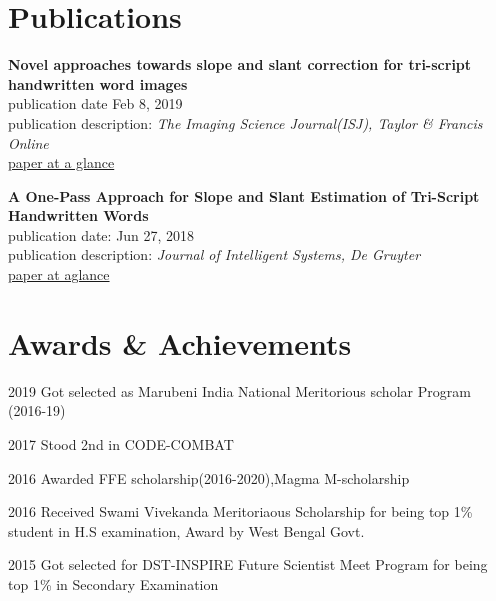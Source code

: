 \documentclass[]{deedy-resume-openfont}
\begin{document}
\begin{minipage}[t]{0.65\textwidth}

\section{Publications} 
\vspace{\topsep} %
\begin{tightemize}
\item 
\textbf{Novel approaches towards slope and slant correction for tri-script handwritten word images}\\
publication date Feb 8, 2019 \\
publication description:
\textit{The Imaging Science Journal(ISJ), Taylor \& Francis Online}\\ 
\href{https://www.tandfonline.com/doi/abs/10.1080/13682199.2019.1574368?journalCode=yims20}{paper at a glance}\\

\item 
\textbf{A One-Pass Approach for Slope and Slant Estimation of Tri-Script Handwritten Words}\\
publication date: Jun 27, 2018 \\
publication description:
\textit{Journal of Intelligent Systems, De Gruyter}\\ 
\href{https://www.degruyter.com/view/j/jisys.ahead-of-print/jisys-2018-0105/jisys-2018-0105.xml}{paper at aglance}\\

\end{tightemize}
\sectionsep



\section{Awards \& Achievements} 
\vspace{\topsep} %
\begin{tightemize}
\item 2019	     Got selected as Marubeni India National Meritorious scholar Program (2016-19)\\
 \item 2017        Stood 2nd in CODE-COMBAT
\item 2016	     Awarded FFE scholarship(2016-2020),Magma M-scholarship\\
\item 2016       Received Swami Vivekanda Meritoriaous Scholarship for being top 1\% student in H.S examination, Award by West Bengal Govt.\\
\item 2015         Got selected for DST-INSPIRE Future Scientist Meet Program for being top 1\% in Secondary Examination \\
\end{tightemize}
\sectionsep
\end{minipage} 
\end{document}
